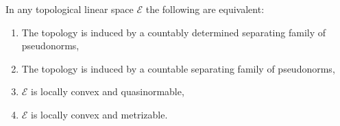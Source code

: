 In any topological linear space $\mathcal{E}$ the following are equivalent:
\begin{enumerate}
\item[(i)] The topology is induced by a countably determined separating family of pseudonorms,
\item[(ii)] The topology is induced by a countable separating family of pseudonorms,
\item[(iii)] $\mathcal{E}$ is locally convex and quasinormable,
\item[(iv)] $\mathcal{E}$ is locally convex and metrizable.
\end{enumerate}
